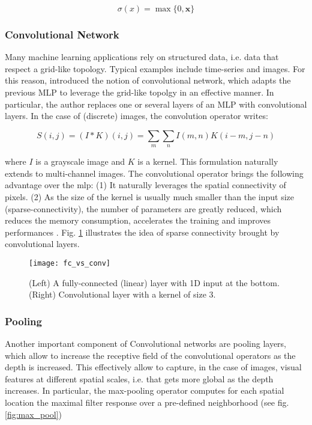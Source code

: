 \begin{equation}
\sigma(x) = \max \{0, \bm{x}\}
\end{equation}

\subsubsection{Convolutional Network}
Many machine learning applications rely on structured data, i.e. data that respect a grid-like topology.
Typical examples include time-series and images.
For this reason, \cite{lecun95} introduced the notion of convolutional network, which adapts the previous MLP to leverage the grid-like topolgy in an effective manner.
In particular, the author replaces one or several layers of an MLP with convolutional layers.
In the case of (discrete) images, the convolution operator writes:

\begin{equation}
S(i,j) = (I * K)(i,j) = \sum_{m} \sum_{n} I(m,n) K(i-m, j-n)
\end{equation}

where $I$ is a grayscale image and $K$ is a kernel.
This formulation naturally extends to multi-channel images.
The convolutional operator brings the following advantage over the \gls{mlp}: (1) It naturally leverages the spatial connectivity of pixels.
(2) As the size of the kernel is usually much smaller than the input size (sparse-connectivity), the number of parameters are greatly reduced, which reduces the memory consumption, accelerates the training and improves performances \cite{lecun95}.
Fig. \ref{fig:cnn_con} illustrates the idea of sparse connectivity brought by convolutional layers.

\begin{figure}[!htpb]
  \centering
  \texttt{[image: fc\_vs\_conv]}
  \caption{(Left) A fully-connected (linear) layer with 1D input at the bottom. (Right) Convolutional layer with a kernel of size 3.}
  \label{fig:cnn_con}
\end{figure}

\subsubsection{Pooling}

Another important component of Convolutional networks are pooling layers, which allow to increase the receptive field of the convolutional operators as the depth is increased.
This effectively allow to capture, in the case of images, visual features at different spatial scales, i.e. that gets more global as the depth increases.
In particular, the max-pooling operator computes for each spatial location the maximal filter response over a pre-defined neighborhood (see fig. \ref{fig:max_pool})

